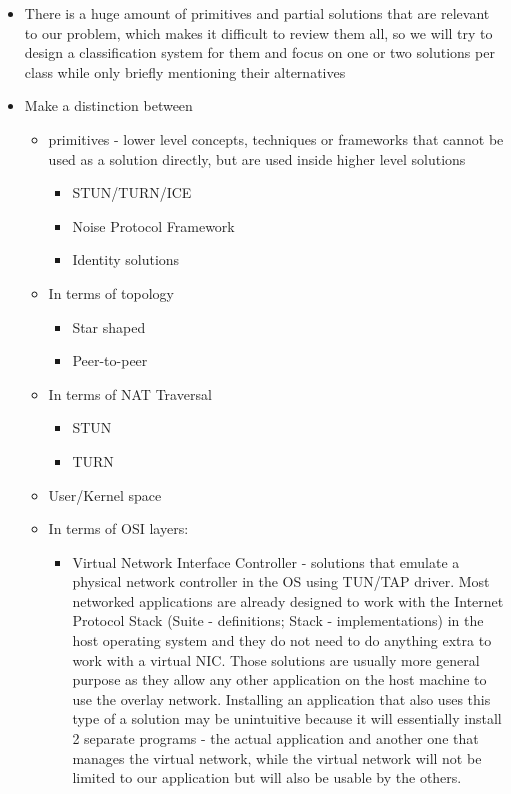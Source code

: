 \begin{itemize}
\item
  There is a huge amount of primitives and partial solutions that are relevant to our problem, which makes it difficult to review them all, so we will try to design a classification system for them and focus on one or two solutions per class while only briefly mentioning their alternatives
\item
  Make a distinction between

  \begin{itemize}
  \tightlist
  \item
    primitives - lower level concepts, techniques or frameworks that cannot be used as a solution directly, but are used inside higher level solutions

    \begin{itemize}
    \tightlist
    \item
      STUN/TURN/ICE
    \item
      Noise Protocol Framework
    \item
      Identity solutions
    \end{itemize}
  \item
    In terms of topology

    \begin{itemize}
    \tightlist
    \item
      Star shaped
    \item
      Peer-to-peer
    \end{itemize}
  \item
    In terms of NAT Traversal

    \begin{itemize}
    \tightlist
    \item
      STUN
    \item
      TURN
    \end{itemize}
  \item
    User/Kernel space
  \item
    In terms of OSI layers:

    \begin{itemize}
    \tightlist
    \item
      Virtual Network Interface Controller - solutions that emulate a physical network controller in the OS using TUN/TAP driver. Most networked applications are already designed to work with the Internet Protocol Stack (Suite - definitions; Stack - implementations) in the host operating system and they do not need to do anything extra to work with a virtual NIC. Those solutions are usually more general purpose as they allow any other application on the host machine to use the overlay network. Installing an application that also uses this type of a solution may be unintuitive because it will essentially install 2 separate programs - the actual application and another one that manages the virtual network, while the virtual network will not be limited to our application but will also be usable by the others.


\end{itemize}
\end{itemize}
\end{itemize}

